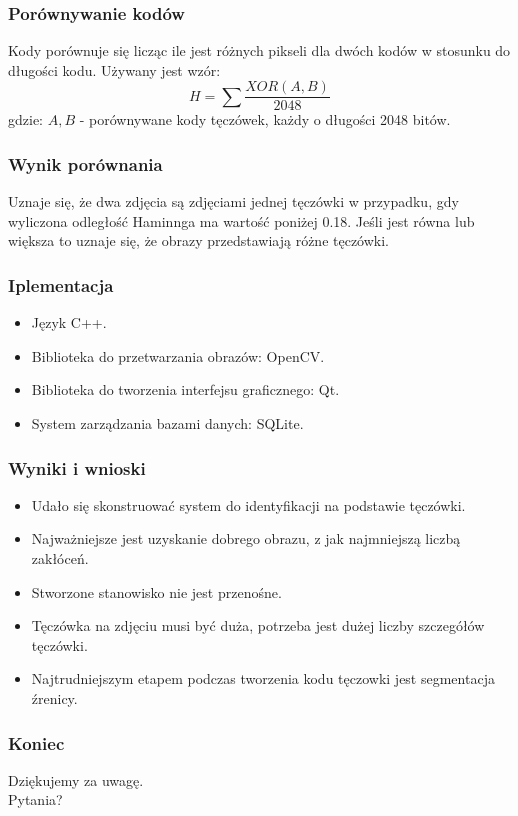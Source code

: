 \documentclass{beamer}
\begin{document}

\begin{frame}
\frametitle{Porównywanie kodów}
Kody porównuje się licząc ile jest różnych pikseli dla dwóch kodów w stosunku do długości kodu. Używany jest wzór:
$$ H = \sum \frac{XOR(A,B)}{2048} $$
gdzie:
$A, B$ - porównywane kody tęczówek, każdy o długości 2048 bitów.\\
\end{frame}


\begin{frame}
\frametitle{Wynik porównania}
Uznaje się, że dwa zdjęcia są zdjęciami jednej tęczówki w przypadku, gdy wyliczona odległość Haminnga ma wartość poniżej 0.18. Jeśli jest równa lub większa to uznaje się, że obrazy przedstawiają różne tęczówki.
\end{frame}


\begin{frame}
\frametitle{Iplementacja}
\begin{itemize}
\item Język C++.
\item Biblioteka do przetwarzania obrazów: OpenCV.
\item Biblioteka do tworzenia interfejsu graficznego: Qt.
\item System zarządzania bazami danych: SQLite.
\end{itemize}
\end{frame}



\begin{frame}
\frametitle{Wyniki i wnioski}
\begin{itemize}
\item Udało się skonstruować system do identyfikacji na podstawie tęczówki.
\item Najważniejsze jest uzyskanie dobrego obrazu, z jak najmniejszą liczbą zakłóceń.
\item Stworzone stanowisko nie jest przenośne.
\item Tęczówka na zdjęciu musi być duża, potrzeba jest dużej liczby szczegółów tęczówki.
\item Najtrudniejszym etapem podczas tworzenia kodu tęczowki jest segmentacja źrenicy.
\end{itemize}
\end{frame}


\begin{frame}
\frametitle{Koniec}

\begin{block}{}
Dziękujemy za uwagę.\\
Pytania?
\end{block}

\end{frame}

\end{document}
